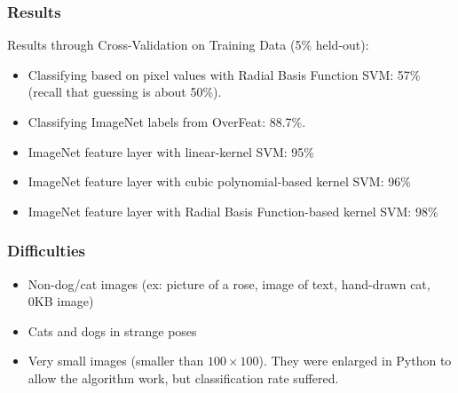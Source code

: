 \documentclass{beamer}
\begin{document}
\begin{frame}
\frametitle{Results}
Results through Cross-Validation on Training Data (5\% held-out):
\begin{itemize}
\item Classifying based on pixel values with Radial Basis Function SVM: 57\% (recall that guessing is about 50\%).
\item Classifying ImageNet labels from OverFeat: 88.7\%.
\item ImageNet feature layer with linear-kernel SVM: 95\%
\item ImageNet feature layer with cubic polynomial-based kernel SVM: 96\%
\item ImageNet feature layer with Radial Basis Function-based kernel SVM: 98\%
\end{itemize}
\end{frame}

\begin{frame}
\frametitle{Difficulties}
\begin{itemize}
\item Non-dog/cat images (ex: picture of a rose, image of text, hand-drawn cat, 0KB image)
\item Cats and dogs in strange poses
\item Very small images (smaller than $100 \times 100$). They were enlarged in Python to allow the algorithm work, but classification rate suffered.
\end{itemize}
\end{frame}
\end{document}
